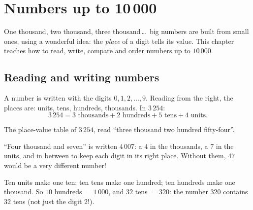\chapter{Numbers up to 10\,000}\label{ch:g3:numbers}

One thousand, two thousand, three thousand\,\dots\ big numbers are
built from small ones, using a wonderful idea: the \emph{place} of a
digit tells its value. This chapter teaches how to read, write,
compare and order numbers up to $10\,000$.

\section{Reading and writing numbers}

\begin{definition}\label{def:g3:numbers:place}
A number is written with the digits $0, 1, 2, \dots, 9$. Reading from
the right, the places are: units, tens, hundreds, thousands. In
$3\,254$:
\[
3\,254 = 3 \text{ thousands} + 2 \text{ hundreds} + 5 \text{ tens}
+ 4 \text{ units}.
\]
\end{definition}

\begin{omfigure}

{\small The place-value table of $3\,254$, read ``three thousand two
hundred fifty-four''.}
\end{omfigure}

\begin{example}\label{ex:g3:numbers:zero}
``Four thousand and seven'' is written $4\,007$: a $4$ in the
thousands, a $7$ in the units, and \emph{} in between to keep
each digit in its right place. Without them, $47$ would be a very
different number!
\end{example}

\begin{example}[Exchanging]\label{ex:g3:numbers:exchange}
Ten units make one ten; ten tens make one hundred; ten hundreds make
one thousand. So $10$ hundreds $= 1\,000$, and $32$ tens
$= 320$: the number $320$ contains $32$ tens (not just the digit
$2$!).
\end{example}

